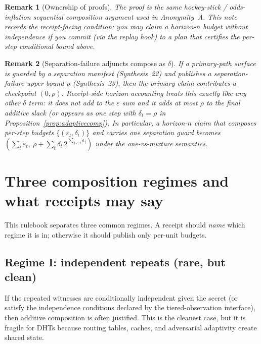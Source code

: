 \documentclass[11pt]{article}
\newtheorem{remark}{Remark}
\begin{document}
\begin{remark}[Ownership of proofs]
The proof is the same hockey-stick / odds-inflation sequential composition argument used in Anonymity~A.\cite{series:oddsinflation}
This note records the \emph{receipt-facing condition}: you may claim a horizon-$n$ budget without independence if you commit (via the replay hook) to a plan that certifies the per-step conditional bound above.
\end{remark}

\begin{remark}[Separation-failure adjuncts compose as $\delta$]
If a primary-path surface is guarded by a separation manifest (Synthesis~22) and publishes a separation-failure upper bound $\rho$ (Synthesis~23), then the primary claim contributes a checkpoint $(0,\rho)$.
Receipt-side horizon accounting treats this exactly like any other $\delta$ term: it does not add to the $\varepsilon$ sum and it adds at most $\rho$ to the final additive slack (or appears as one step with $\delta_t=\rho$ in Proposition~\ref{prop:adaptivecomp}).\cite{series:primarysepmanifest,series:probsep}
In particular, a horizon-$n$ claim that composes per-step budgets $\{(\varepsilon_t,\delta_t)\}$ and carries one separation guard becomes
$(\sum_t\varepsilon_t,\ \rho + \sum_t \delta_t\,2^{\sum_{j<t}\varepsilon_j})$ under the one-vs-mixture semantics.
\end{remark}

\section{Three composition regimes and what receipts may say}
This rulebook separates three common regimes.
A receipt should \emph{name} which regime it is in; otherwise it should publish only per-unit budgets.

\subsection{Regime I: independent repeats (rare, but clean)}
If the repeated witnesses are conditionally independent given the secret (or satisfy the independence conditions declared by the tiered-observation interface), then additive composition is often justified.\cite{series:contractobjects,series:tieredobs}
This is the cleanest case, but it is fragile for DHTs because routing tables, caches, and adversarial adaptivity create shared state.
\end{document}
